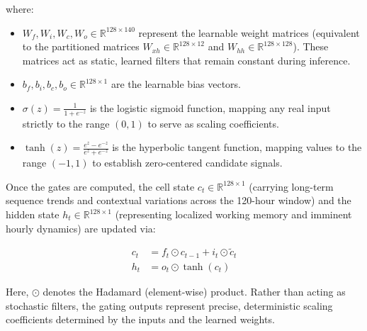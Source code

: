 \documentclass[12pt,a4paper,oneside]{report}
\begin{document}
where:
\begin{itemize}
    \item $W_f, W_i, W_c, W_o \in \mathbb{R}^{128 \times 140}$ represent the learnable weight matrices (equivalent to the partitioned matrices $W_{xh} \in \mathbb{R}^{128 \times 12}$ and $W_{hh} \in \mathbb{R}^{128 \times 128}$). These matrices act as static, learned filters that remain constant during inference.
    \item $b_f, b_i, b_c, b_o \in \mathbb{R}^{128 \times 1}$ are the learnable bias vectors.
    \item $\sigma(z) = \frac{1}{1 + e^{-z}}$ is the logistic sigmoid function, mapping any real input strictly to the range $(0, 1)$ to serve as scaling coefficients.
    \item $\tanh(z) = \frac{e^z - e^{-z}}{e^z + e^{-z}}$ is the hyperbolic tangent function, mapping values to the range $(-1, 1)$ to establish zero-centered candidate signals.
\end{itemize}

Once the gates are computed, the cell state $c_t \in \mathbb{R}^{128 \times 1}$ (carrying long-term sequence trends and contextual variations across the 120-hour window) and the hidden state $h_t \in \mathbb{R}^{128 \times 1}$ (representing localized working memory and imminent hourly dynamics) are updated via:

\begin{align}
c_t &= f_t \odot c_{t-1} + i_t \odot \tilde{c}_t \label{eq:lstm_cell_update} \\
h_t &= o_t \odot \tanh(c_t) \label{eq:lstm_hidden_update}
\end{align}

Here, $\odot$ denotes the Hadamard (element-wise) product. Rather than acting as stochastic filters, the gating outputs represent precise, deterministic scaling coefficients determined by the inputs and the learned weights.
\end{document}
